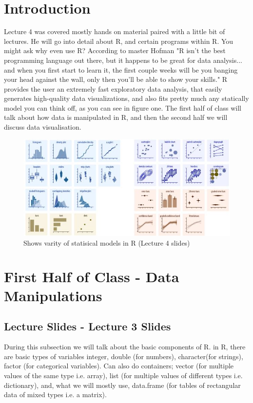 
\renewcommand{\familydefault}{\sfdefault}



\maketitle {}

\section{Introduction}
Lecture 4 was covered mostly hands on material paired with a little bit of lectures. He will go into detail about R, and certain programs within R. You might ask why even use R? According to master Hofman "R isn't the best programming language out there, but it happens to be great for data analysis... and when you first start to learn it, the first couple weeks will be you banging your head against the wall, only then you'll be able to show your skills." R provides the user an extremely fast exploratory data analysis, that easily generates high-quality data visualizations, and also fits pretty much any statically model you can think off, as you can see in figure one. The first half of class will talk about how data is manipulated in R, and then the second half we will discuss data visualisation.
\begin{figure}[h!]
  \caption{ Shows varity of statisical models in R (Lecture 4 slides)}
  \includegraphics[width=\textwidth]{figures/MSDimage1}
\end{figure}

\section{First Half of Class - Data Manipulations}
\subsection{Lecture Slides - Lecture 3 Slides}
During this subsection we will talk about the basic components of R. in R, there are basic types of variables integer, double (for numbers), character(for strings), factor (for categorical variables). Can also do containers; vector (for multiple values of the same type i.e. array), list (for multiple values of different types i.e. dictionary), and, what we will mostly use, data.frame (for tables of rectangular data of mixed types i.e. a matrix). 

